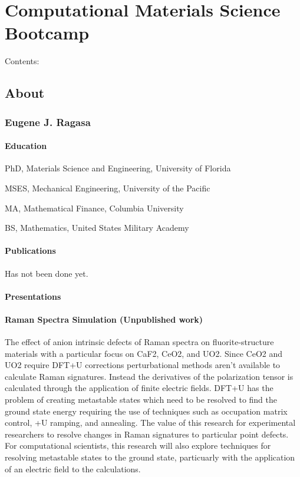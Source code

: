 \documentclass[letterpaper,10pt,english]{sphinxmanual}
\begin{document}
\chapter{Computational Materials Science Bootcamp}
\label{\detokenize{index:computational-materials-science-bootcamp}}
Contents:


\section{About}
\label{\detokenize{about:id1}}\label{\detokenize{about::doc}}

\subsection{Eugene J. Ragasa}
\label{\detokenize{about:eugene-j-ragasa}}

\subsubsection{Education}
\label{\detokenize{about:education}}
PhD, Materials Science and Engineering, University of Florida

MSES, Mechanical Engineering, University of the Pacific

MA, Mathematical Finance, Columbia University

BS, Mathematics, United States Military Academy


\subsubsection{Publications}
\label{\detokenize{about:publications}}
Has not been done yet.


\subsubsection{Presentations}
\label{\detokenize{about:presentations}}

\subsubsection{Raman Spectra Simulation (Unpublished work)}
\label{\detokenize{about:raman-spectra-simulation-unpublished-work}}
The effect of anion intrinsic defects of Raman spectra on fluorite-structure materials with a particular focus on CaF2, CeO2, and UO2.  Since CeO2 and UO2 require DFT+U corrections perturbational methods aren’t available to calculate Raman signatures.  Instead the derivatives of the polarization tensor is calculated through the application of finite electric fields.  DFT+U has the problem of creating metastable states which need to be resolved to find the ground state energy requiring the use of techniques such as occupation matrix control, +U ramping, and annealing.  The value of this research for experimental researchers to resolve changes in Raman signatures to particular point defects.  For computational scientists, this research will also explore techniques for resolving metastable states to the ground state, particuarly with the application of an electric field to the calculations.
\end{document}
